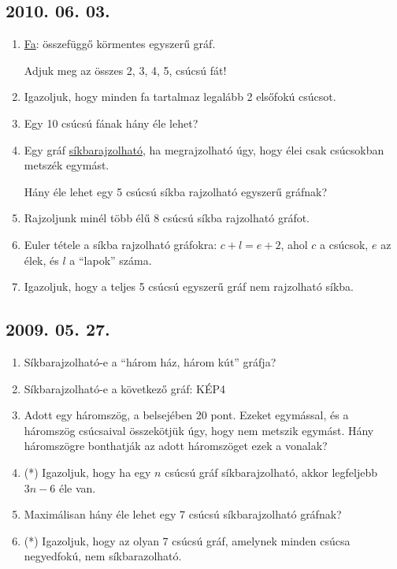 \documentclass{article}
\begin{document}
\subsection*{2010. 06. 03.}
\begin{enumerate}
\item \underline{Fa}: összefüggő körmentes egyszerű gráf.

Adjuk meg az összes 2, 3, 4, 5, csúcsú fát!
\item Igazoljuk, hogy minden fa tartalmaz legalább 2 elsőfokú csúcsot.
\item Egy 10 csúcsú fának hány éle lehet?
\item Egy gráf \underline{síkbarajzolható}, ha megrajzolható úgy, hogy élei csak csúcsokban metszék egymást.

Hány éle lehet egy 5 csúcsú síkba rajzolható egyszerű gráfnak?
\item Rajzoljunk minél több élű 8 csúcsú síkba rajzolható gráfot.
\item Euler tétele a síkba rajzolható gráfokra: $c+l=e+2$,
ahol $c$ a csúcsok, $e$ az élek, és $l$ a “lapok” száma.
\item Igazoljuk, hogy a teljes 5 csúcsú egyszerű gráf nem rajzolható síkba.
\end{enumerate}


\subsection*{2009. 05. 27.}
\begin{enumerate}
\item Síkbarajzolható-e a “három ház, három kút” gráfja?
\item Síkbarajzolható-e a következő gráf: KÉP4
\item Adott egy háromszög, a belsejében 20 pont. Ezeket egymással, és a háromszög csúcsaival összekötjük úgy, hogy nem metszik egymást. Hány háromszögre bonthatják az adott háromszöget ezek a vonalak?
\item (*) Igazoljuk, hogy ha egy $n$ csúcsú gráf síkbarajzolható, akkor legfeljebb $3n-6$ éle van.
\item Maximálisan hány éle lehet egy 7 csúcsú síkbarajzolható gráfnak?
\item (*) Igazoljuk, hogy az olyan 7 csúcsú gráf, amelynek minden csúcsa negyedfokú, nem síkbarazolható.
\end{enumerate}
\end{document}
